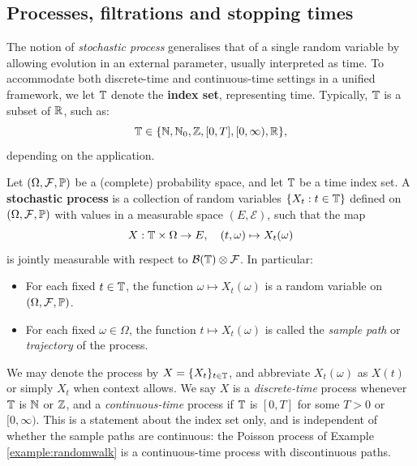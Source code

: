 \vspace{-0.2cm}

\subsection{Processes, filtrations and stopping times}\label{subsec:processesfiltrations}

The notion of \emph{stochastic process} generalises that of a single random variable by allowing evolution in an external parameter, usually interpreted as time. To accommodate both discrete-time and continuous-time settings in a unified framework, we let \(\mathbb{T}\) denote the \textbf{index set}, representing time. Typically, \(\mathbb{T}\) is a subset of \(\mathbb{R}\), such as:
\[
\mathbb{T} \in \{ \mathbb{N}, \mathbb{N}_0, \mathbb{Z}, [0, T], [0, \infty), \mathbb{R} \},
\]
depending on the application.

\begin{definition}
Let \((\Omega, \mathcal{F}, \mathbb{P})\) be a (complete) probability space, and let \(\mathbb{T} \) be a time index set. A \textbf{stochastic process} is a collection of random variables \(\{ X_t : t \in \mathbb{T} \}\) defined on \((\Omega, \mathcal{F}, \mathbb{P})\) with values in a measurable space \((E, \mathcal{E})\), such that the map
\[
X : \mathbb{T} \times \Omega \to E, \quad (t, \omega) \mapsto X_t(\omega)
\]
is jointly measurable with respect to \(\mathcal{B}(\mathbb{T}) \otimes \mathcal{F}\). In particular:
\begin{itemize}
    \item For each fixed \(t \in \mathbb{T}\), the function \(\omega \mapsto X_t(\omega)\) is a random variable on \((\Omega, \mathcal{F}, \mathbb{P})\).
    \item For each fixed \(\omega \in \Omega\), the function \(t \mapsto X_t(\omega)\) is called the \emph{sample path} or \emph{trajectory} of the process.
\end{itemize}
We may denote the process by \(X = \{X_t\}_{t \in \mathbb{T}}\), and abbreviate \(X_t(\omega)\) as \(X(t)\) or simply \(X_t\) when context allows. We say $X$ is a \textit{discrete-time} process whenever $\mathbb{T}$ is $\mathbb{N}$ or $\mathbb{Z}$, and a \textit{continuous-time} process if $\mathbb{T}$ is $[0,T]$ for some $T>0$ or $[0,\infty)$. This is a statement about the index set only, and is independent of whether the sample paths are continuous: the Poisson process of Example \ref{example:randomwalk} is a continuous-time process with discontinuous paths.
\end{definition}

\vspace{-0.15cm}


